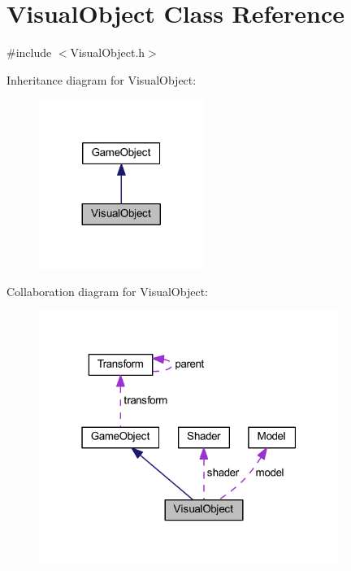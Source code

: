 \hypertarget{class_visual_object}{}\section{Visual\+Object Class Reference}
\label{class_visual_object}


{\ttfamily \#include $<$Visual\+Object.\+h$>$}



Inheritance diagram for Visual\+Object\+:\nopagebreak
\begin{figure}[H]
\begin{center}
\leavevmode
\includegraphics[width=152pt]{class_visual_object__inherit__graph}
\end{center}
\end{figure}


Collaboration diagram for Visual\+Object\+:\nopagebreak
\begin{figure}[H]
\begin{center}
\leavevmode
\includegraphics[width=277pt]{class_visual_object__coll__graph}
\end{center}
\end{figure}
